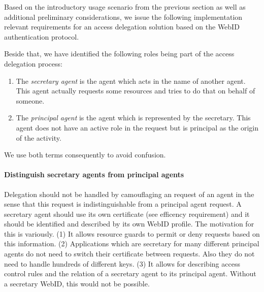 \documentclass[a4paper]{llncs}
\begin{document}



Based on the introductory usage scenario from the previous section as well as additional preliminary considerations, we issue the following implementation relevant requirements for an access delegation solution based on the WebID authentication protocol.

Beside that, we have identified the following roles being part of the access delegation process:
\begin{enumerate}
    \item The \textit{secretary agent} is the agent which acts in the name of another agent.
This agent actually requests some resources and tries to do that on behalf of someone.
    \item The \textit{principal agent} is the agent which is represented by the secretary.
This agent does not have an active role in the request but is principal as the origin of the activity.
\end{enumerate}
We use both terms consequently to avoid confusion.

\paragraph{Distinguish secretary agents from principal agents}
Delegation should not be handled by camouflaging an request of an agent in the sense that this request is indistinguishable from a principal agent request.
A secretary agent should use its own certificate (see efficency requirement) and it should be identified and described by its own WebID profile.
The motivation for this is variously.
(1) It allows resource guards to permit or deny requests based on this information.
(2) Applications which are secretary for many different principal agents do not need to switch their certificate between requests.
Also they do not need to handle hundreds of different keys.
(3) It allows for describing access control rules and the relation of a secretary agent to its principal agent.
Without a secretary WebID, this would not be possible.
\end{document}
